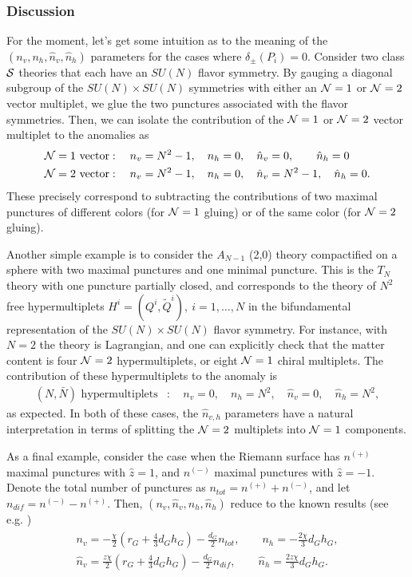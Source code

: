 \documentclass[a4paper,11pt]{article}
\newcommand{\ba}[1]{\begin{align} #1 \end{align} }
\newcommand{\bs}[1]{\begin{split} #1 \end{split} }
\def\CN{{\cal N}}
\def\CS{{\cal S}}
\begin{document}
\subsubsection*{Discussion}%

For the moment, let's get some intuition as to the meaning of the $(n_v,n_h,\hat{n}_v,\hat{n}_h)$ parameters for the cases where $\delta_\pm(P_i)=0$. Consider two class $\CS$ theories that each have an $SU(N)$ flavor symmetry. By gauging a diagonal subgroup of the $SU(N)\times SU(N)$ symmetries with either an $\CN=1$ or $\CN=2$ vector multiplet, we glue the two punctures associated with the flavor symmetries. Then, we can isolate the contribution of the $\CN=1$ or $\CN=2$ vector multiplet to the anomalies as \cite{Agarwal:2014rua}
	\ba{\bs{
\CN=1\ \text{vector}&:\quad	n_v=N^2-1,\quad n_h=0,\quad \hat{n}_v=0,\quad\quad \hat{n}_h=0\\
\CN=2\ \text{vector}&:\quad	n_v=N^2-1,\quad n_h=0,\quad \hat{n}_v=N^2-1,\quad \hat{n}_h=0.}
} 
These precisely correspond to subtracting the contributions of two maximal punctures of different colors (for $\CN=1$ gluing) or of the same color (for $\CN=2$ gluing).

Another simple example is to consider the $A_{N-1}$ (2,0) theory compactified on a sphere with two maximal punctures and one minimal puncture. This is the $T_N$ theory with one puncture partially closed, and corresponds to the theory of $N^2$ free hypermultiplets $H^i=(Q^i,\tilde{Q}^i),\ i=1,\dots,N$ in the bifundamental representation of the $SU(N)\times SU(N)$ flavor symmetry. For instance, with $N=2$ the theory is Lagrangian, and one can explicitly check that the matter content is four $\CN=2$ hypermultiplets, or eight $\CN=1$ chiral multiplets. The contribution of these hypermultiplets to the anomaly is 
	\ba{
(N,\bar{N}) \text{ hypermultiplets}&:\quad n_v=0,\quad   n_h=N^2,\quad \hat{n}_v=0,\quad \hat{n}_h=N^2,
	}
as expected. In both of these cases, the $\hat{n}_{v,h}$ parameters have a natural interpretation in terms of splitting the $\CN=2$ multiplets into $\CN=1$ components. 

As a final example, consider the case when the Riemann surface has $n^{(+)}$ maximal punctures with $\hat{z}=1$, and $n^{(-)}$ maximal punctures with $\hat{z}=-1$. Denote the total number of punctures as $n_{tot}=n^{(+)}+n^{(-)}$, and let $n_{dif}=n^{(-)}-n^{(+)}$. Then, $(n_v,\hat{n}_v,n_h,\hat{n}_h)$ reduce to the known results (see e.g. \cite{Nardoni:2016ffl})
	\ba{\bs{
	n_v=-\frac{\chi}{2} (r_G + \frac{4}{3} d_G h_G)- \frac{d_G}{2}n_{tot},\qquad n_h=-\frac{2\chi}{3} d_Gh_G,\\
	\hat{n}_v=\frac{z\chi}{2}  (r_G + \frac{4}{3} d_G h_G)- \frac{d_G}{2} n_{dif},\qquad \hat{n}_h=\frac{2z\chi}{3}d_Gh_G.
	}}
	
\end{document}
